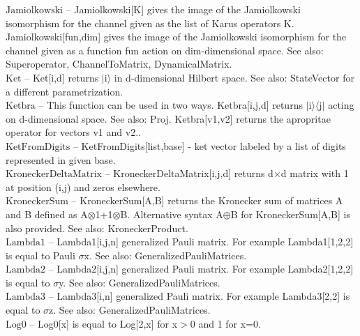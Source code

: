 \documentclass[a4paper,10pt]{scrartcl}
\begin{document}
\textbf{$ \text{Jamiolkowski} $ }-- Jamiolkowski[K] gives the image of the Jamiolkowski isomorphism for the channel given as the list of Karus operators K. Jamiolkowski[fun,dim] gives the image of the Jamiolkowski isomorphism for the channel given as a function fun action on dim-dimensional space. See also: Superoperator, ChannelToMatrix, DynamicalMatrix.$  $\\

\textbf{$ \text{Ket} $ }-- Ket[i,d] returns $|$i$\rangle $ in d-dimensional Hilbert space. See also: StateVector for a different parametrization.$  $\\

\textbf{$ \text{Ketbra} $ }-- This function can be used in two ways. Ketbra[i,j,d] returns $|$i$\rangle \langle $j$|$ acting on d-dimensional space. See also: Proj. Ketbra[v1,v2] returns the apropritae operator for vectors v1 and v2..$  $\\

\textbf{$ \text{KetFromDigits} $ }-- KetFromDigits[list,base] - ket vector labeled by a list of digits represented in given base.$  $\\

\textbf{$ \text{KroneckerDeltaMatrix} $ }-- KroneckerDeltaMatrix[i,j,d] returns d$\times $d matrix with 1 at position (i,j) and zeros elsewhere.$  $\\

\textbf{$ \text{KroneckerSum} $ }-- KroneckerSum[A,B] returns the Kronecker sum of matrices A and B defined as A$\otimes $1+1$\otimes $B. Alternative syntax A$\oplus $B for KroneckerSum[A,B] is also provided. See also: KroneckerProduct.$  $\\

\textbf{$ \text{Lambda1} $ }-- Lambda1[i,j,n] generalized Pauli matrix. For example Lambda1[1,2,2] is equal to Pauli $\sigma $x. See also: GeneralizedPauliMatrices.$  $\\

\textbf{$ \text{Lambda2} $ }-- Lambda2[i,j,n] generalized Pauli matrix. For example Lambda2[1,2,2] is equal to $\sigma $y. See also: GeneralizedPauliMatrices.$  $\\

\textbf{$ \text{Lambda3} $ }-- Lambda3[i,n] generalized Pauli matrix. For example Lambda3[2,2] is equal to $\sigma $z. See also: GeneralizedPauliMatrices.$  $\\

\textbf{$ \text{Log0} $ }-- Log0[x] is equal to Log[2,x] for x$>$0 and 1 for x=0.$  $\\
\end{document}
